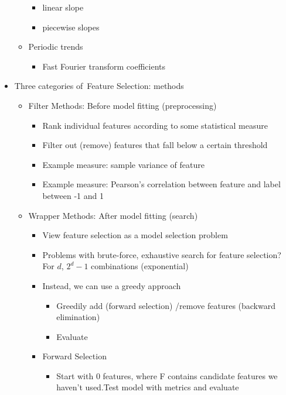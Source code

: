 \documentclass[10pt, oneside]{article}
\begin{document}
\begin{itemize}
\begin{itemize}
\begin{itemize}
            \item linear slope
            \item piecewise slopes
        \end{itemize}
        \item Periodic trends
        \begin{itemize}
            \item Fast Fourier transform coefficients
        \end{itemize}
    \end{itemize}
    \item Three categories of Feature Selection: methods
    \begin{itemize}
        \item Filter Methods: Before model fitting (preprocessing)
        \begin{itemize}
            \item Rank individual features according to some statistical measure
            \item Filter out (remove) features that fall below a certain threshold
            \item Example measure: sample variance of feature
            \item Example measure: Pearson's correlation between feature and label between -1 and 1
        \end{itemize}
        \item Wrapper Methods: After model fitting (search)
        \begin{itemize}
            \item View feature selection as a model selection problem
            \item Problems with brute-force, exhaustive search for feature selection? For $d$, $2^d - 1$ combinations (exponential)
            \item Instead, we can use a greedy approach
            \begin{itemize}
                \item Greedily add (forward selection) /remove features (backward elimination)
                \item Evaluate 
            \end{itemize}
            \item Forward Selection
            \begin{itemize}
                \item Start with 0 features, where F contains candidate features we haven't used.Test model with metrics and evaluate

\end{itemize}
\end{itemize}
\end{itemize}
\end{itemize}
\end{document}
